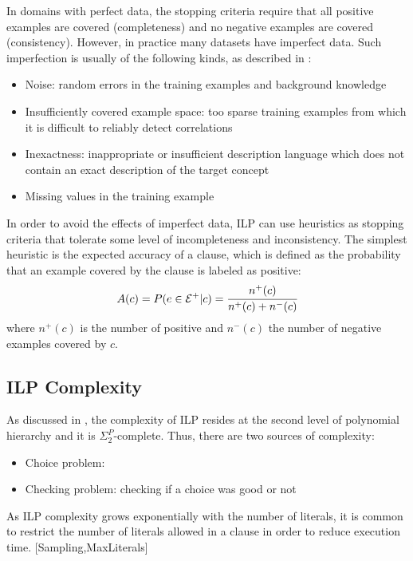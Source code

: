 In domains with perfect data, the stopping criteria require that all positive examples are covered (completeness) and no
negative examples are covered (consistency). However, in practice many datasets have imperfect data. Such imperfection
is usually of the following kinds, as described in \cite{DBLP:conf/aii/LavracD92}:

\begin{itemize}
  \item Noise: random errors in the training examples and background knowledge
  \item Insufficiently covered example space: too sparse training examples from which it is difficult to reliably
detect correlations
  \item Inexactness: inappropriate or insufficient description language which does not contain an exact description of
the target concept
  \item Missing values in the training example
\end{itemize}

In order to avoid the effects of imperfect data, ILP can use heuristics as stopping criteria that tolerate
some level of incompleteness and inconsistency. The simplest heuristic is the expected accuracy of a clause, which is
defined as the probability that an example
covered by the clause is labeled as positive:
\begin{equation}
A(c)=P(e \in \mathcal{E}^{+}|c)=\cfrac{n^{+}(c)}{n^{+}(c)+n^{-}(c)} 
\end{equation}
where $n^{+}(c)$ is the number of positive and $n^{-}(c)$ the number of negative examples covered by $c$. 

\subsection{ILP Complexity}

As discussed in \cite{DBLP:journals/ngc/GottlobLS99}, the complexity of ILP resides at the second level of polynomial
hierarchy and it is $\Sigma_2^P$-complete. Thus, there are two sources of complexity:
\begin{itemize}
 \item Choice problem: 
 \item Checking problem: checking if a choice was good or not
\end{itemize}


As ILP complexity grows exponentially with the number of literals, it is common to restrict the number of literals
allowed in a clause in order to reduce execution time.
[Sampling,MaxLiterals]


